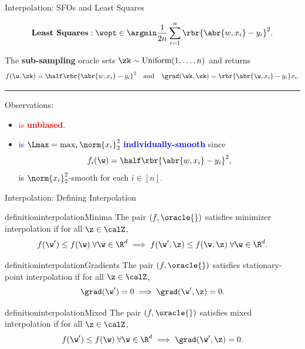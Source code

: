 \documentclass[mathserif,notheorems, hyperref={colorlinks, citecolor=blue, urlcolor=blue, linkcolor=blue}]{beamer}
\begin{document}
    \begin{frame}{Interpolation: SFOs and Least Squares}
        \vspace{-1ex}

        \[ \textbf{Least Squares}: \wopt \in \argmin \frac{1}{2n} \sum_{i=1}^n \rbr{\abr{w, x_i} - y_i}^2. \]
        
        \vspace{2ex} 
        
        The \textbf{sub-sampling} oracle sets \( \zk \sim \text{Uniform}(1, \ldots, n) \) and returns 
        \[ f(\w, \zk) =  \half \rbr{\abr{w, x_i} - y_i}^2 \quad \text{and} \quad \grad(\wk, \zk) = \rbr{\abr{\w, x_i} - y_i} x_i. \]

        \pause 
        \rule{\textwidth}{0.4pt}
        Observations: 
        \begin{itemize}
            \item \textcolor{red}{\oracle{} is \textbf{unbiased}.} 
            \item \textcolor{blue}{\oracle{} is \( \Lmax = \max_{i} \norm{x_i}^2_2 \) \textbf{individually-smooth}} since 
                    \[ f_{i}(\w) = \half \rbr{\abr{w, x_{i}} - y_{i}}^2, \]
                    is \( \norm{x_{i}}_2^2 \)-smooth for each \( i \in [n] \).
        \end{itemize}

    \end{frame}

    \begin{frame}{Interpolation: Defining Interpolation}
        
        \begin{restatable}{definition}{interpolationMinima}\label{def:interpolation-minima}
            The pair \( (f, \oracle{}) \) satisfies minimizer interpolation if for all \( \z \in \calZ \),
            \[ f(\w') \leq f(\w) \; \forall \w \in \R^d \implies f(\w', \z) \leq f(\w, \z) \; \forall \w \in \R^d.  \]
        \end{restatable}
        \pause
        \begin{restatable}{definition}{interpolationGradients}\label{def:interpolation-gradients}
            The pair \( (f, \oracle{}) \) satisfies stationary-point interpolation if for all \( \z \in \calZ \),
            \[ \grad(\w') = 0 \implies \grad(\w', \z) = 0. \]
        \end{restatable}
        \pause
        \begin{restatable}{definition}{interpolationMixed}\label{def:interpolation-mixed}
            The pair \( (f, \oracle{}) \) satisfies mixed interpolation if for all \( \z \in \calZ \),
            \[ f(\w') \leq f(\w) \; \forall \w \in \R^d \implies \grad(\w', \z) = 0. \]
        \end{restatable}

    \end{frame}
\end{document}
